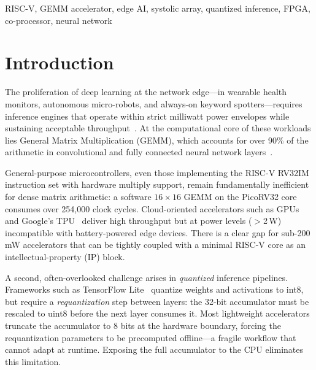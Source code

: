 \documentclass[conference]{IEEEtran}
\begin{document}
\begin{IEEEkeywords}
RISC-V, GEMM accelerator, edge AI, systolic array, quantized inference, FPGA, co-processor, neural network
\end{IEEEkeywords}

\section{Introduction}

The proliferation of deep learning at the network edge---in wearable health monitors, autonomous micro-robots, and always-on keyword spotters---requires inference engines that operate within strict milliwatt power envelopes while sustaining acceptable throughput~\cite{banbury2021mlperf}. At the computational core of these workloads lies General Matrix Multiplication (GEMM), which accounts for over 90\% of the arithmetic in convolutional and fully connected neural network layers~\cite{jouppi2017datacenter}.

General-purpose microcontrollers, even those implementing the RISC-V RV32IM instruction set with hardware multiply support, remain fundamentally inefficient for dense matrix arithmetic: a software $16\times16$ GEMM on the PicoRV32 core consumes over 254{,}000 clock cycles. Cloud-oriented accelerators such as GPUs and Google's TPU~\cite{jouppi2017datacenter} deliver high throughput but at power levels ($>$2\,W) incompatible with battery-powered edge devices. There is a clear gap for sub-200\,mW accelerators that can be tightly coupled with a minimal RISC-V core as an intellectual-property (IP) block.

A second, often-overlooked challenge arises in \emph{quantized} inference pipelines. Frameworks such as TensorFlow Lite~\cite{tflite} quantize weights and activations to int8, but require a \emph{requantization} step between layers: the 32-bit accumulator must be rescaled to uint8 before the next layer consumes it. Most lightweight accelerators truncate the accumulator to 8 bits at the hardware boundary, forcing the requantization parameters to be precomputed offline---a fragile workflow that cannot adapt at runtime. Exposing the full accumulator to the CPU eliminates this limitation.
\end{document}
